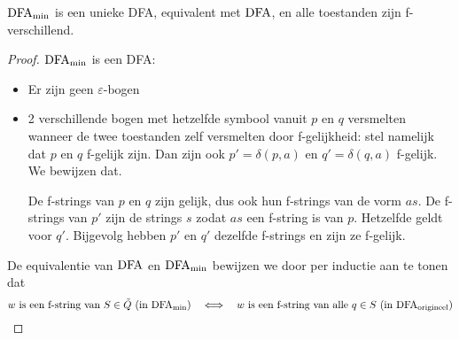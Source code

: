 \documentclass[../aanvullingen_cursus.tex]{subfiles}
\begin{document}
\begin{stelling}
	\(\text{DFA}_{\text{min}}\) is een unieke DFA, equivalent met \(\text{DFA}\), en alle toestanden zijn f-verschillend.
\end{stelling}

\begin{proof}

	\(\text{DFA}_{\text{min}}\) is een DFA:
	\begin{itemize}
		\item Er zijn geen \(\varepsilon\)-bogen
		\item 2 verschillende bogen met hetzelfde symbool vanuit \(p\) en \(q\)  versmelten wanneer de twee toestanden zelf versmelten door f-gelijkheid:
		stel namelijk dat \(p\) en \(q\) f-gelijk zijn. Dan zijn ook \( p'=\delta(p,a) \) en \( q'=\delta(q,a) \) f-gelijk. We bewijzen dat.

		De f-strings van \(p\) en \(q\) zijn gelijk, dus ook hun f-strings van de vorm \(as\). De f-strings van \(p'\) zijn de strings \( s \) zodat \( as \) een f-string is van \( p \). Hetzelfde geldt voor \( q' \). Bijgevolg hebben \( p' \) en \( q' \) dezelfde f-strings en zijn ze f-gelijk.
	\end{itemize}

	De equivalentie van \(\text{DFA}\) en \(\text{DFA}_{\text{min}}\) bewijzen we door per inductie aan te tonen dat \[ w \text{ is een f-string van } S \in \tilde{Q} \text{ (in } \text{DFA}_{\text{min}} \text{)} \quad \Longleftrightarrow \quad w \text{ is een f-string van alle } q\in S \text{ (in } \text{DFA}_{\text{origineel}} \text{)}\]


\end{proof}
\end{document}
